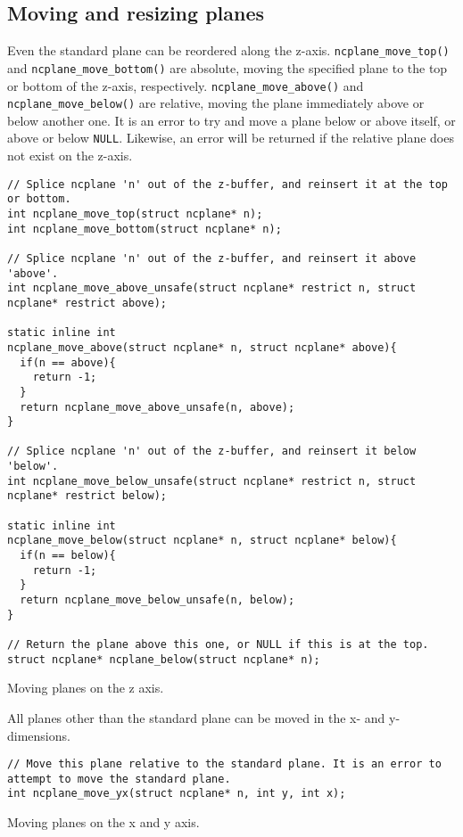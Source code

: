 \subsection{Moving and resizing planes}
Even the standard plane can be reordered along the z-axis. \texttt{ncplane\_move\_top()}
and \texttt{ncplane\_move\_bottom()} are absolute, moving the specified plane
to the top or bottom of the z-axis, respectively. \texttt{ncplane\_move\_above()}
and \texttt{ncplane\_move\_below()} are relative, moving the plane immediately
above or below another one. It is an error to try and move a plane below or above itself,
or above or below \texttt{NULL}. Likewise, an error will be returned if the relative
plane does not exist on the z-axis.
\begin{listing}[!htbp]
\begin{verbatim}
// Splice ncplane 'n' out of the z-buffer, and reinsert it at the top or bottom.
int ncplane_move_top(struct ncplane* n);
int ncplane_move_bottom(struct ncplane* n);

// Splice ncplane 'n' out of the z-buffer, and reinsert it above 'above'.
int ncplane_move_above_unsafe(struct ncplane* restrict n, struct ncplane* restrict above);

static inline int
ncplane_move_above(struct ncplane* n, struct ncplane* above){
  if(n == above){
    return -1;
  }
  return ncplane_move_above_unsafe(n, above);
}

// Splice ncplane 'n' out of the z-buffer, and reinsert it below 'below'.
int ncplane_move_below_unsafe(struct ncplane* restrict n, struct ncplane* restrict below);

static inline int
ncplane_move_below(struct ncplane* n, struct ncplane* below){
  if(n == below){
    return -1;
  }
  return ncplane_move_below_unsafe(n, below);
}

// Return the plane above this one, or NULL if this is at the top.
struct ncplane* ncplane_below(struct ncplane* n);
\end{verbatim}
\caption{Moving planes on the z axis.}
\end{listing}

All planes other than the standard plane can be moved in the x- and y-dimensions.
\begin{listing}[!htbp]
\begin{verbatim}
// Move this plane relative to the standard plane. It is an error to attempt to move the standard plane.
int ncplane_move_yx(struct ncplane* n, int y, int x);
\end{verbatim}
\caption{Moving planes on the x and y axis.}
\end{listing}

